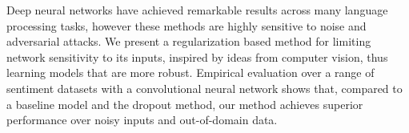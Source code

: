 Deep neural networks have achieved remarkable results across many language processing tasks, however these methods are highly sensitive to noise and adversarial attacks. We present a regularization based method for limiting network sensitivity to its inputs, inspired by ideas from computer vision, thus learning models that are more robust. Empirical evaluation over a range of sentiment datasets with a convolutional neural network shows that, compared to a baseline model and the dropout method, our method achieves superior performance over noisy inputs and out-of-domain data.
